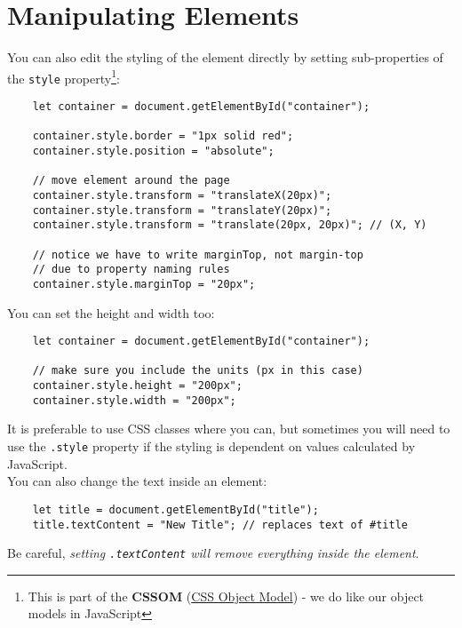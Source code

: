 \section{Manipulating Elements}

You can also edit the styling of the element directly by setting sub-properties of the \texttt{style} property\footnote{This is part of the \textbf{CSSOM} (\href{https://css-tricks.com/an-introduction-and-guide-to-the-css-object-model-cssom}{CSS Object Model}) - we do like our object models in JavaScript}:

\begin{verbatim}
    let container = document.getElementById("container");

    container.style.border = "1px solid red";
    container.style.position = "absolute";

    // move element around the page
    container.style.transform = "translateX(20px)";
    container.style.transform = "translateY(20px)";
    container.style.transform = "translate(20px, 20px)"; // (X, Y)

    // notice we have to write marginTop, not margin-top
    // due to property naming rules
    container.style.marginTop = "20px";
\end{verbatim}

\pagebreak

You can set the height and width too:

\begin{verbatim}
    let container = document.getElementById("container");

    // make sure you include the units (px in this case)
    container.style.height = "200px";
    container.style.width = "200px";
\end{verbatim}

It is preferable to use CSS classes where you can, but sometimes you will need to use the \texttt{.style} property if the styling is dependent on values calculated by JavaScript.
\\

You can also change the text inside an element:

\begin{verbatim}
    let title = document.getElementById("title");
    title.textContent = "New Title"; // replaces text of #title
\end{verbatim}

Be careful, \textit{setting \texttt{.textContent} will remove everything inside the element}.



